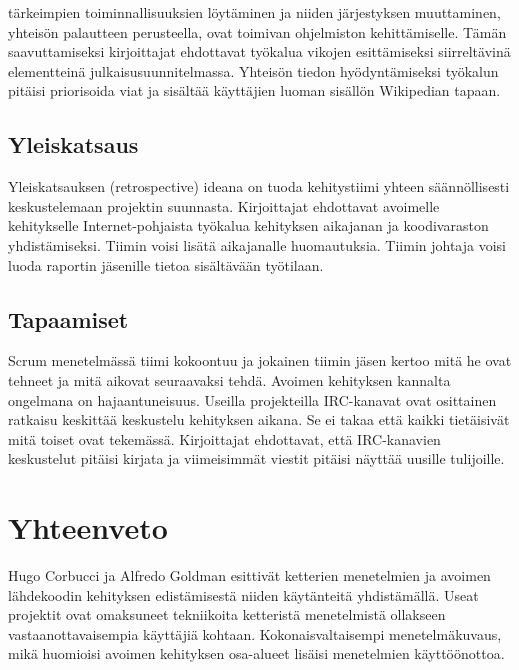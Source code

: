 \documentclass[finnish]{tktltiki2}
\theoremstyle{definition}
\theoremstyle{remark}
\begin{document}
tärkeimpien toiminnallisuuksien löytäminen ja niiden järjestyksen muuttaminen, yhteisön palautteen perusteella, ovat toimivan ohjelmiston kehittämiselle. Tämän saavuttamiseksi kirjoittajat ehdottavat työkalua vikojen esittämiseksi siirreltävinä elementteinä julkaisusuunnitelmassa. Yhteisön tiedon hyödyntämiseksi työkalun pitäisi priorisoida viat ja sisältää käyttäjien luoman sisällön Wikipedian tapaan.

\subsection{Yleiskatsaus}

Yleiskatsauksen (retrospective) ideana on tuoda kehitystiimi yhteen säännöllisesti keskustelemaan projektin suunnasta. Kirjoittajat ehdottavat avoimelle kehitykselle Internet-pohjaista työkalua kehityksen aikajanan ja koodivaraston yhdistämiseksi. Tiimin voisi lisätä aikajanalle huomautuksia. Tiimin johtaja voisi luoda raportin jäsenille tietoa sisältävään työtilaan.

\subsection{Tapaamiset}

Scrum menetelmässä tiimi kokoontuu ja jokainen tiimin jäsen kertoo mitä he ovat tehneet ja mitä aikovat seuraavaksi tehdä. Avoimen kehityksen kannalta ongelmana on hajaantuneisuus.
Useilla projekteilla IRC-kanavat ovat osittainen ratkaisu keskittää keskustelu kehityksen aikana. Se ei takaa että kaikki tietäisivät mitä toiset ovat tekemässä. Kirjoittajat ehdottavat, että IRC-kanavien keskustelut pitäisi kirjata ja viimeisimmät viestit pitäisi näyttää uusille tulijoille.

\section{Yhteenveto}

Hugo Corbucci ja Alfredo Goldman esittivät ketterien menetelmien ja avoimen lähdekoodin kehityksen edistämisestä niiden käytänteitä yhdistämällä. Useat projektit ovat omaksuneet tekniikoita ketteristä menetelmistä ollakseen vastaanottavaisempia käyttäjiä kohtaan. Kokonaisvaltaisempi menetelmäkuvaus, mikä huomioisi avoimen kehityksen osa-alueet lisäisi menetelmien käyttöönottoa.

%
%
% 
%



\end{document}
